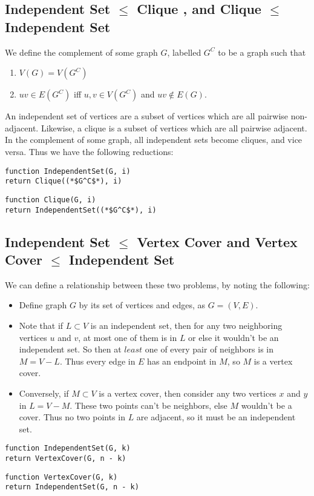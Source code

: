 \documentclass[12pt]{article}
\providecommand{\reducible}[2]{
  \textbf{#1} $\leq$ \textbf{#2}
}
\begin{document}
\subsection{\reducible{Independent Set}{Clique}, and \reducible{Clique}{Independent Set}}
We define the complement of some graph $G$, labelled $G^C$ to be a graph such that
\begin{enumerate}
  \item $V(G) = V(G^C)$
  \item $uv \in E(G^C)$ iff $u,v \in V(G^C)$ and $uv \not\in E(G)$.
\end{enumerate}
An independent set of vertices are a subset of vertices which are all pairwise non-adjacent.
Likewise, a clique is a subset of vertices which are all pairwise adjacent.
In the complement of some graph, all independent sets become cliques, and vice versa.
Thus we have the following reductions:
\begin{lstlisting}
function IndependentSet(G, i)
return Clique((*$G^C$*), i)
\end{lstlisting}
\begin{lstlisting}
function Clique(G, i)
return IndependentSet((*$G^C$*), i)
\end{lstlisting}


\subsection{\reducible{Independent Set}{Vertex Cover} and \reducible{Vertex Cover}{Independent Set}}
We can define a relationship between these two problems, by noting the following:
\begin{itemize}
  \item Define graph $G$ by its set of vertices and edges, as $G = (V,E)$.
  \item Note that if $L \subset V$ is an independent set, then for any two neighboring vertices $u$ and $v$, at most one of them is in $L$ or else it wouldn't be an independent set. So then at $least$ one of every pair of neighbors is in $M = V - L$. Thus every edge in $E$ has an endpoint in $M$, so $M$ is a vertex cover.
  \item Conversely, if $M \subset V$ is a vertex cover, then consider any two vertices $x$ and $y$ in $L = V - M$. These two points can't be neighbors, else $M$ wouldn't be a cover. Thus no two points in $L$ are adjacent, so it must be an independent set.
\end{itemize}
\begin{lstlisting}
function IndependentSet(G, k)
return VertexCover(G, n - k)
\end{lstlisting}
\begin{lstlisting}
function VertexCover(G, k)
return IndependentSet(G, n - k)
\end{lstlisting}
\end{document}

